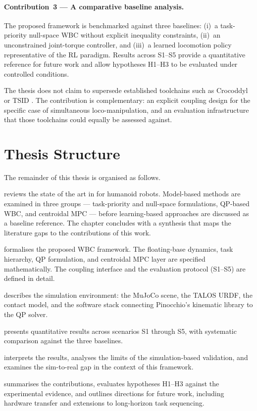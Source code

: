 \paragraph{Contribution~3 — A comparative baseline analysis.}
The proposed framework is benchmarked against three baselines:
(i)~a task-priority null-space WBC without explicit inequality
constraints, (ii)~an unconstrained joint-torque controller, and
(iii)~a learned locomotion policy representative of the RL paradigm.
Results across S1--S5 provide a quantitative reference for future work
and allow hypotheses H1--H3 to be evaluated under controlled conditions.

The thesis does not claim to supersede established toolchains such as
Crocoddyl \cite{Crocoddyl} or TSID \cite{DelPrete2016}. The contribution
is complementary: an explicit coupling design for the specific case of
simultaneous loco-manipulation, and an evaluation infrastructure that
those toolchains could equally be assessed against.


\section{Thesis Structure}
\label{sec:structure}

The remainder of this thesis is organised as follows.

 reviews the state of the art in \WBC{} for humanoid
robots. Model-based methods are examined in three groups — task-priority
and null-space formulations, QP-based WBC, and centroidal MPC — before
learning-based approaches are discussed as a baseline reference. The
chapter concludes with a synthesis that maps the literature gaps to the
contributions of this work.

 formalises the proposed WBC framework. The
floating-base dynamics, task hierarchy, QP formulation, and centroidal
MPC layer are specified mathematically. The coupling interface and the
evaluation protocol (S1--S5) are defined in detail.

 describes the simulation environment: the MuJoCo
scene, the TALOS URDF, the contact model, and the software stack
connecting Pinocchio's kinematic library \cite{Pinocchio} to the QP
solver.

 presents quantitative results across scenarios
S1 through S5, with systematic comparison against the three baselines.

 interprets the results, analyses the limits of
the simulation-based validation, and examines the sim-to-real gap in
the context of this framework.

 summarises the contributions, evaluates
hypotheses H1--H3 against the experimental evidence, and outlines
directions for future work, including hardware transfer and extensions
to long-horizon task sequencing.
